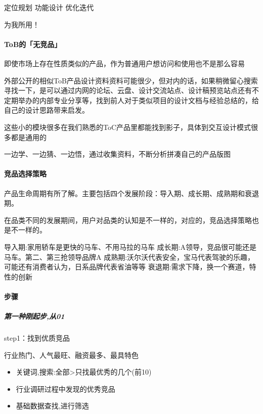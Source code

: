 \documentclass[letterpaper,11pt,english]{sphinxmanual}
\begin{document}
定位规划 功能设计 优化迭代

为我所用！


\paragraph{ToB的「无竞品」}
\label{\detokenize{chapter_skill/goods_analysis:tob}}
即使市场上存在性质类似的产品，作为普通用户想访问和使用也不是那么容易

外部公开的相似ToB产品设计资料资料可能很少，但对内的话，如果稍微留心搜索寻找一下，是可以通过内网的论坛、云盘、设计交流站点、设计稿预览站点还有不定期举办的内部专业分享等，找到前人对于类似项目的设计文档与经验总结的，给自己的设计思路带来启发。

这些小的模块很多在我们熟悉的ToC产品里都能找到影子，具体到交互设计模式很多都是通用的

一边学、一边猜、一边悟，通过收集资料，不断分析拼凑自己的产品版图


\paragraph{竞品选择策略}
\label{\detokenize{chapter_skill/goods_analysis:id15}}\label{\detokenize{chapter_skill/goods_analysis:id16}}
产品生命周期有所了解。主要包括四个发展阶段：导入期、成长期、成熟期和衰退期。

在品类不同的发展期间，用户对品类的认知是不一样的，对应的，竞品选择策略也是不一样的。

导入期:家用轿车是更快的马车、不用马拉的马车
成长期:A领导，竞品很可能还是马车。第二、第三抢领导品牌A
成熟期:沃尔沃代表安全，宝马代表驾驶的乐趣，可能还有消费者认为，日系品牌代表省油等等
衰退期:需求下降，换一个赛道，特性的创新


\paragraph{步骤}
\label{\detokenize{chapter_skill/goods_analysis:id17}}

\subparagraph{第一种刚起步,从0\sphinxhyphen{}1}
\label{\detokenize{chapter_skill/goods_analysis:id18}}
step1：找到优质竞品

行业热门、人气最旺、融资最多、最具特色
\begin{itemize}
\item {} 
关键词,搜索:全部>只找最优秀的几个(前10)

\item {} 
行业调研过程中发现的优秀竞品

\item {} 
基础数据查找,进行筛选

\end{itemize}
\end{document}
